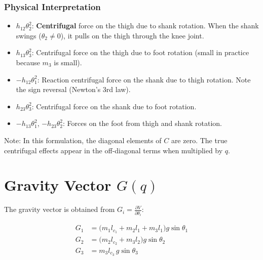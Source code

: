\documentclass[11pt,a4paper]{article}
\newcommand{\vc}[1]{\bm{#1}}
\newcommand{\dt}[1]{\dot{#1}}
\newcommand{\pder}[2]{\frac{\partial #1}{\partial #2}}
\def\vc#1{#1}%
\def\dt#1{#1}%
\def\bm#1{#1}%
\begin{document}
\subsubsection*{Physical Interpretation}
\begin{itemize}
    \item $h_{12}\dt{\theta}_2^2$: \textbf{Centrifugal} force on the thigh due to shank rotation.
          When the shank swings ($\dt{\theta}_2 \neq 0$), it pulls on the thigh through
          the knee joint.
    \item $h_{13}\dt{\theta}_3^2$: Centrifugal force on the thigh due to foot rotation
          (small in practice because $m_3$ is small).
    \item $-h_{12}\dt{\theta}_1^2$: Reaction centrifugal force on the shank due to thigh rotation.
          Note the sign reversal (Newton's 3rd law).
    \item $h_{23}\dt{\theta}_3^2$: Centrifugal force on the shank due to foot rotation.
    \item $-h_{13}\dt{\theta}_1^2$, $-h_{23}\dt{\theta}_2^2$: Forces on the foot from thigh
          and shank rotation.
\end{itemize}

Note: In this formulation, the diagonal elements of $\vc{C}$ are zero. The true
centrifugal effects appear in the off-diagonal terms when multiplied by $\dt{\vc{q}}$.

\section{Gravity Vector \texorpdfstring{$\vc{G}(\vc{q})$}{G(q)}}

The gravity vector is obtained from $G_i = \pder{V}{\theta_i}$:

\begin{resultbox}
\begin{align}
    G_1 &= \bigl(m_1 l_{c_1} + m_2 l_1 + m_3 l_1\bigr) g \sin\theta_1 \label{eq:G1} \\[4pt]
    G_2 &= \bigl(m_2 l_{c_2} + m_3 l_2\bigr) g \sin\theta_2 \label{eq:G2} \\[4pt]
    G_3 &= m_3 l_{c_3} \, g \sin\theta_3 \label{eq:G3}
\end{align}
\end{resultbox}
\end{document}
